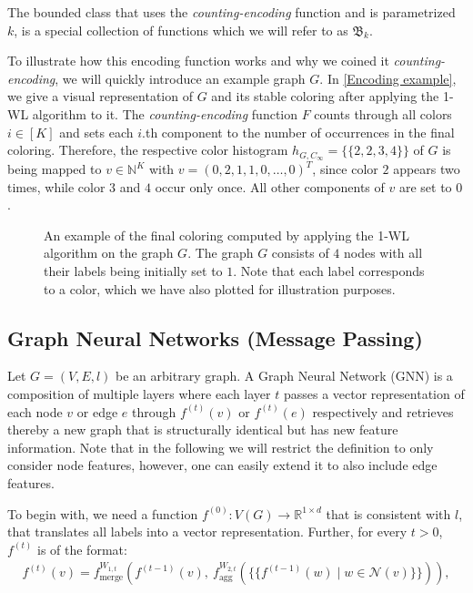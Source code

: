 \documentclass[11pt, dvipsnames, DIV=12]{scrreprt}
\theoremstyle{definition}
\newcommand{\MSopen}{\{\!\!\{}
\newcommand{\MSclose}{\}\!\!\}}
\newcommand{\wlnn}{\text{1-WL+NN }}
\begin{document}
The bounded \wlnn class that uses the \emph{counting-encoding} function and is parametrized $k$, is a special collection of functions which we will refer to as $\mathfrak{B}_{k}$.

To illustrate how this encoding function works and why we coined it \emph{counting-encoding}, we will quickly introduce an example graph $G$. In \autoref{Encoding example}, we give a visual representation of $G$ and its stable coloring after applying the 1-WL algorithm to it. The \emph{counting-encoding} function $F$ counts through all colors $i \in [K]$ and sets each $i$.th component to the number of occurrences in the final coloring. Therefore, the respective color histogram $h_{G, C_\infty} = \MSopen 2, 2, 3, 4 \MSclose$ of $G$ is being mapped to $v \in \mathbb{N}^K$ with $v = (0, 2, 1, 1,0,  \dots ,0)^T$, since color $2$ appears two times, while color $3$ and $4$ occur only once. All other components of $v$ are set to $0$.
\begin{figure}[H]
    \centering
    
    \caption{An example of the final coloring computed by applying the 1-WL algorithm on the graph $G$. The graph $G$ consists of $4$ nodes with all their labels being initially set to $1$. Note that each label corresponds to a color, which we have also plotted for illustration purposes.}
    \label{Encoding example}
\end{figure}

\subsection{Graph Neural Networks (Message Passing)}\label{sec:GNN Defintion}
Let $G = (V, E, l)$ be an arbitrary graph. A Graph Neural Network (GNN) is a composition of multiple layers where each layer $t$ passes a vector representation of each node $v$ or edge $e$ through $f^{(t)}(v)$ or $f^{(t)}(e)$ respectively and retrieves thereby a new graph that is structurally identical but has new feature information. Note that in the following we will restrict the definition to only consider node features, however, one can easily extend it to also include edge features. 

To begin with, we need a function $f^{(0)}: V(G) \rightarrow \mathbb{R}^{1 \times d}$ that is consistent with $l$, that translates all labels into a vector representation. Further, for every $t > 0$, $f^{(t)}$ is of the format:
\begin{align*}
f^{(t)}(v) = f^{W_{1,t}}_{\text{merge}} (f^{(t-1)}(v), \  f^{W_{2,t}}_{\text{agg}}( \MSopen f^{(t-1)}(w) \mid w \in \mathcal{N}(v) \MSclose )),
\end{align*}
\end{document}
